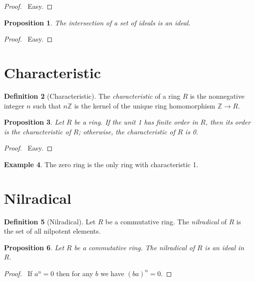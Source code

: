\documentclass{book}
\let\qed\relax
\newtheorem{prop}{Proposition}[chapter]
\theoremstyle{definition}
\newtheorem{df}[prop]{Definition}
\newtheorem{ex}[prop]{Example}
\begin{document}
\begin{proof}
\pf\ Easy. \qed
\end{proof}

\begin{prop}
The intersection of a set of ideals is an ideal.
\end{prop}

\begin{proof}
\pf\ Easy. \qed
\end{proof}

\section{Characteristic}

\begin{df}[Characteristic]
The \emph{characteristic} of a ring $R$ is the nonnegative integer $n$ such that $n \mathbb{Z}$ is the kernel of the unique ring homomorphism $\mathbb{Z} \rightarrow R$.
\end{df}

\begin{prop}
Let $R$ be a ring.
If the unit 1 has finite order in $R$, then its order is the characteristic of $R$; otherwise, the characteristic of $R$ is 0.
\end{prop}

\begin{proof}
\pf\ Easy. \qed
\end{proof}

\begin{ex}
The zero ring is the only ring with characteristic 1.
\end{ex}

\section{Nilradical}

\begin{df}[Nilradical]
Let $R$ be a commutative ring. The \emph{nilradical} of $R$ is the set of all nilpotent elements.
\end{df}

\begin{prop}
Let $R$ be a commutative ring. The nilradical of $R$ is an ideal in $R$.
\end{prop}

\begin{proof}
\pf\ If $a^n = 0$ then for any $b$ we have $(ba)^n = 0$. \qed
\end{proof}
\end{document}
